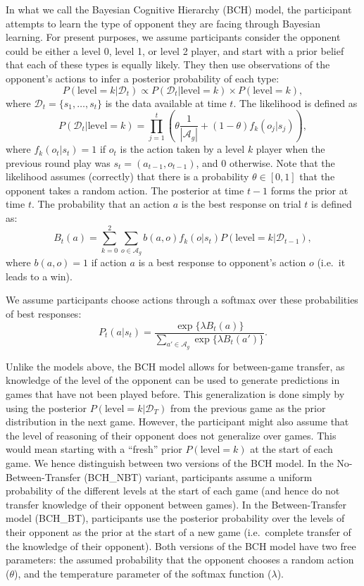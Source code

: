 \documentclass[smallextended]{svjour3}       %
\begin{document}
In what we call the Bayesian Cognitive Hierarchy (BCH) model, the
participant attempts to learn the type of opponent they are facing
through Bayesian learning. For present purposes, we assume participants
consider the opponent could be either a level 0, level 1, or level 2
player, and start with a prior belief that each of these types is
equally likely. They then use observations of the opponent's actions to
infer a posterior probability of each type:
\[P(\text{level}=k | \mathcal{D}_{t})  \propto  P(\mathcal{D}_{t}|\text{level}=k ) \times P(\text{level}=k) ,\]
where \(\mathcal{D}_{t} = \{s_1,\ldots,s_t\}\) is the data available at
time \(t\). The likelihood is defined as
\[P(\mathcal{D}_{t}|\text{level}=k) = \prod_{j=1}^t \left( \theta \frac{1}{|\mathcal{A}_g|} + (1-\theta) f_k(o_j|s_{j})\right) ,\]
where \(f_k(o_t|s_{t}) = 1\) if \(o_t\) is the action taken by a level
\(k\) player when the previous round play was
\(s_t = (a_{t-1}, o_{t-1})\), and 0 otherwise. Note that the likelihood
assumes (correctly) that there is a probability \(\theta \in [0,1]\)
that the opponent takes a random action. The posterior at time \(t-1\)
forms the prior at time \(t\). The probability that an action \(a\) is
the best response on trial \(t\) is defined as:
\[B_t(a) = \sum_{k = 0}^2 \sum_{o \in \mathcal{A}_g} b(a,o) f_k(o|s_{t})  P(\text{level}=k|\mathcal{D}_{t-1}), \]
where \(b(a,o) = 1\) if action \(a\) is a best response to opponent's
action \(o\) (i.e.~it leads to a win).

We assume participants choose actions through a softmax over these
probabilities of best responses:
\[P_t(a|s_t) = \frac{\exp\{\lambda B_t(a) \}}{\sum_{a' \in \mathcal{A}_g} \exp \{ \lambda B_t(a')\}}.\]

Unlike the models above, the BCH model allows for between-game transfer,
as knowledge of the level of the opponent can be used to generate
predictions in games that have not been played before. This
generalization is done simply by using the posterior
\(P(\text{level} = k|\mathcal{D}_T)\) from the previous game as the
prior distribution in the next game. However, the participant might also
assume that the level of reasoning of their opponent does not generalize
over games. This would mean starting with a ``fresh'' prior
\(P(\text{level} = k)\) at the start of each game. We hence distinguish
between two versions of the BCH model. In the No-Between-Transfer
(BCH\_NBT) variant, participants assume a uniform probability of the
different levels at the start of each game (and hence do not transfer
knowledge of their opponent between games). In the Between-Transfer
model (BCH\_BT), participants use the posterior probability over the
levels of their opponent as the prior at the start of a new game
(i.e.~complete transfer of the knowledge of their opponent). Both
versions of the BCH model have two free parameters: the assumed
probability that the opponent chooses a random action (\(\theta\)), and
the temperature parameter of the softmax function (\(\lambda\)).
\end{document}
